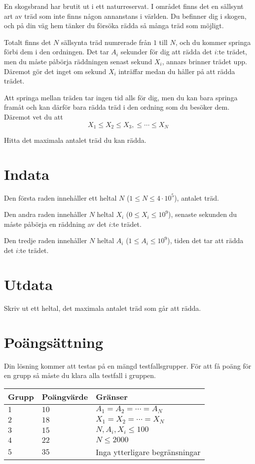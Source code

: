 
En skogsbrand har brutit ut i ett naturreservat. I området finns det en sällsynt art av träd
som inte finns någon annanstans i världen. Du befinner dig i skogen, och på din väg hem tänker du försöka rädda så många träd som möjligt.

Totalt finns det $N$ sällsynta träd numrerade från $1$ till $N$, och du kommer springa förbi dem i den ordningen. 
Det tar $A_i$ sekunder för dig att rädda det $i$:te trädet, men du måste påbörja räddningen
senast sekund $X_i$, annars brinner trädet upp. Däremot gör det inget om sekund $X_i$ inträffar medan
du håller på att rädda trädet.

Att springa mellan träden tar ingen tid alls för dig, men du kan bara springa framåt och kan därför
bara rädda träd i den ordning som du besöker dem. Däremot vet du att
$$X_1 \leq X_2 \leq X_3, \leq \cdots \leq X_N$$

Hitta det maximala antalet träd du kan rädda.

\section*{Indata}
Den första raden innehåller ett heltal $N$ ($1 \leq N \leq 4 \cdot 10^5$), antalet träd.

Den andra raden innehåller $N$ heltal $X_i$ ($0 \leq X_i \leq 10^9$), senaste sekunden du måste
påbörja en räddning av det $i$:te trädet.

Den tredje raden innehåller $N$ heltal $A_i$ ($1 \leq A_i \leq 10^9$), tiden det tar att rädda det 
$i$:te trädet.

\section*{Utdata}
Skriv ut ett heltal, det maximala antalet träd som går att rädda.

\section*{Poängsättning}
Din lösning kommer att testas på en mängd testfallsgrupper.
För att få poäng för en grupp så måste du klara alla testfall i gruppen.

\noindent
\begin{tabular}{| l | l | p{12cm} |}
  \hline
  Grupp & Poängvärde & Gränser \\ \hline
  $1$   & $10$       & $A_1 = A_2 = \cdots = A_N$\\ \hline
  $2$   & $18$       & $X_1 = X_2 = \cdots = X_N$  \\ \hline
  $3$   & $15$       & $N, A_i, X_i \leq 100$ \\ \hline
  $4$   & $22$       & $N \leq 2000$ \\ \hline
  $5$   & $35$       & Inga ytterligare begränsningar \\ \hline
\end{tabular}
